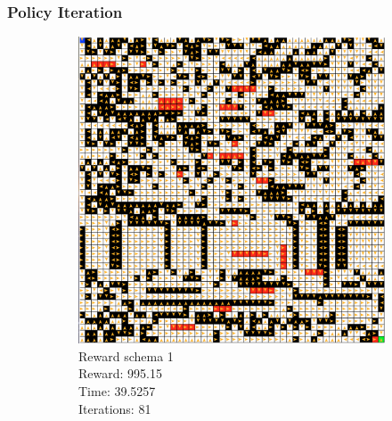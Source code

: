 \documentclass[a4paper,10pt]{article}
\begin{document}
\subsubsection{Policy Iteration}
\begin{figure}[h!]
        \centering
        \begin{subfigure}[b]{0.3\textwidth}
                \includegraphics[width=\textwidth]{figures/50x50_piter_r1.png}
                \caption{Reward schema 1\\
                Reward:  995.15 \\
                Time:  39.5257\\
                Iterations: 81 }
                \label{fig:gull}
        \end{subfigure}%
        ~ %
        \begin{subfigure}[b]{0.3\textwidth}

\end{subfigure}
\end{figure}
\end{document}
